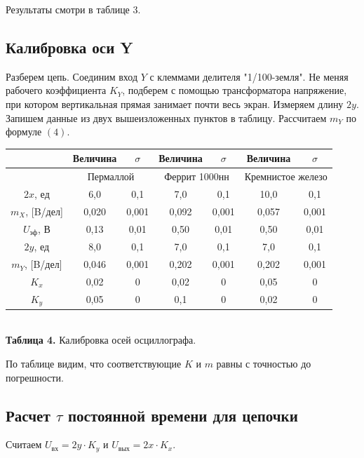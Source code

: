 \documentclass[a4paper, 12pt]{article}%
\begin{document}
	Результаты смотри в таблице 3.
	\subsection*{Калибровка оси Y}
	Разберем цепь. Соединим вход $Y$ с клеммами делителя "1/100-земля". Не меняя рабочего коэффициента $K_Y$, подберем с помощью трансформатора напряжение, при котором вертикальная прямая занимает почти весь экран. Измеряем длину $2y$. Запишем данные из двух вышеизложенных пунктов в таблицу. Рассчитаем $m_Y$ по формуле $(4)$.
	
	\begin{center}
		\begin{tabular}{|c|c|c|c|c|c|c|}
			\hline
			& Величина & $\sigma$ & Величина & $\sigma$ & Величина & $\sigma$ \\ \hline
			& \multicolumn{2}{c|}{Пермаллой} & \multicolumn{2}{c|}{Феррит 1000нн} & \multicolumn{2}{c|}{Кремнистое железо} \\ \hline
			$2x$, ед & 6,0 & 0,1 & 7,0 & 0,1 & 10,0 & 0,1 \\ \hline
			$m_X$, {[}B/дел{]} & 0,020 & 0,001 & 0,092 & 0,001 & 0,057 & 0,001 \\ \hline
			$U_{\text{эф}}$, В & 0,13 & 0,01 & 0,50 & 0,01 & 0,50 & 0,01 \\ \hline
			$2y$, ед & 8,0 & 0,1 & 7,0 & 0,1 & 7,0 & 0,1 \\ \hline
			$m_Y$, {[}B/дел{]} & 0,046 & 0,001 & 0,202 & 0,001 & 0,202 & 0,001 \\ \hline
			$K_x$ & 0,02 & 0 & 0,02 & 0 & 0,05 & 0 \\ \hline
			$K_y$ & 0,05 & 0 & 0,1 & 0 & 0,02 & 0 \\ \hline
		\end{tabular}\\
		\textbf{Таблица 4.} Калибровка осей осциллографа.
	\end{center}
	По таблице видим, что соответствующие $K$ и $m$ равны с точностью до погрешности.
	\subsection*{Расчет $\tau$ постоянной времени для цепочки}
	Считаем $U_{\text{вх}} = 2y \cdot K_y$ и $U_{\text{вых}} = 2x \cdot K_x$.
	
\end{document}
